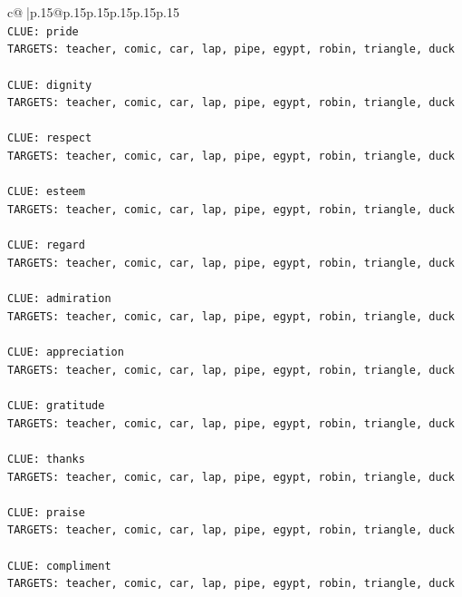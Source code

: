 \documentclass{article}
\begin{document}
{\begin{supertabular}{c@{$\;$}|p{.15\linewidth}@{}p{.15\linewidth}p{.15\linewidth}p{.15\linewidth}p{.15\linewidth}p{.15\linewidth}}
{{{\\ 
\texttt{CLUE: pride} \\
\texttt{TARGETS: teacher, comic, car, lap, pipe, egypt, robin, triangle, duck} \\
\\ 
\texttt{CLUE: dignity} \\
\texttt{TARGETS: teacher, comic, car, lap, pipe, egypt, robin, triangle, duck} \\
\\ 
\texttt{CLUE: respect} \\
\texttt{TARGETS: teacher, comic, car, lap, pipe, egypt, robin, triangle, duck} \\
\\ 
\texttt{CLUE: esteem} \\
\texttt{TARGETS: teacher, comic, car, lap, pipe, egypt, robin, triangle, duck} \\
\\ 
\texttt{CLUE: regard} \\
\texttt{TARGETS: teacher, comic, car, lap, pipe, egypt, robin, triangle, duck} \\
\\ 
\texttt{CLUE: admiration} \\
\texttt{TARGETS: teacher, comic, car, lap, pipe, egypt, robin, triangle, duck} \\
\\ 
\texttt{CLUE: appreciation} \\
\texttt{TARGETS: teacher, comic, car, lap, pipe, egypt, robin, triangle, duck} \\
\\ 
\texttt{CLUE: gratitude} \\
\texttt{TARGETS: teacher, comic, car, lap, pipe, egypt, robin, triangle, duck} \\
\\ 
\texttt{CLUE: thanks} \\
\texttt{TARGETS: teacher, comic, car, lap, pipe, egypt, robin, triangle, duck} \\
\\ 
\texttt{CLUE: praise} \\
\texttt{TARGETS: teacher, comic, car, lap, pipe, egypt, robin, triangle, duck} \\
\\ 
\texttt{CLUE: compliment} \\
\texttt{TARGETS: teacher, comic, car, lap, pipe, egypt, robin, triangle, duck} \\
\\ 
}}}
\end{supertabular}}
\end{document}
